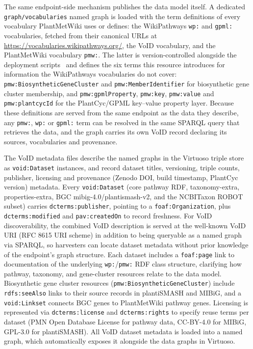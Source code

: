\documentclass[11pt,a4paper]{article}
\begin{document}
The same endpoint-side mechanism publishes the data model itself. A dedicated
\texttt{graph/\allowbreak{}vocabularies} named graph is loaded with the term definitions of every vocabulary
PlantMetWiki uses or defines: the WikiPathways \texttt{wp:} and \texttt{gpml:} vocabularies, fetched
from their canonical URLs at \url{https://vocabularies.wikipathways.org/}, the VoID vocabulary, and
the PlantMetWiki vocabulary \texttt{pmw:}. The latter is version-controlled alongside the deployment
scripts~\cite{delpup2026snorql} and defines the six terms this resource introduces for information the
WikiPathways vocabularies do not cover: \texttt{pmw:BiosyntheticGeneCluster} and
\texttt{pmw:MemberIdentifier} for biosynthetic gene cluster membership, and
\texttt{pmw:gpmlProperty}, \texttt{pmw:key}, \texttt{pmw:value} and \texttt{pmw:plantcycId} for the
PlantCyc/GPML key--value property layer. Because these definitions are served from the same endpoint
as the data they describe, any \texttt{pmw:}, \texttt{wp:} or \texttt{gpml:} term can be resolved in
the same SPARQL query that retrieves the data, and the graph carries its own VoID record declaring
its sources, vocabularies and provenance.

The VoID metadata files describe the named graphs in the Virtuoso triple store as
\texttt{void:Dataset} instances, and record dataset titles, versioning, triple counts, publisher,
licensing and provenance (Zenodo DOI, build timestamp, PlantCyc version) metadata. Every
\texttt{void:Dataset} (core pathway RDF, taxonomy-extra, properties-extra, BGC
mibig-4.0/plantismash-v2, and the NCBITaxon ROBOT subset) carries \texttt{dcterms:\allowbreak{}publisher}, pointing
to a \texttt{foaf:\allowbreak{}Organization}, plus \texttt{dcterms:\allowbreak{}modified} and \texttt{pav:\allowbreak{}createdOn} to record
freshness. For VoID discoverability, the combined VoID description is served at the well-known VoID
URI (RFC 8615 URI scheme) in addition to being queryable as a named graph via SPARQL, so harvesters
can locate dataset metadata without prior knowledge of the endpoint's graph structure. Each dataset
includes a \texttt{foaf:page} link to documentation of the underlying \texttt{wp:}/\texttt{pmw:} RDF
class structure, clarifying how pathway, taxonomy, and gene-cluster resources relate to the data
model. Biosynthetic gene cluster resources (\texttt{pmw:BiosyntheticGeneCluster}) include
\texttt{rdfs:seeAlso} links to their source records in plantiSMASH and MIBiG, and a
\texttt{void:Linkset} connects BGC genes to PlantMetWiki pathway genes. Licensing is represented via
\texttt{dcterms:license} and \texttt{dcterms:rights} to specify reuse terms per dataset (PMN Open
Database License for pathway data, CC-BY-4.0 for MIBiG, GPL-3.0 for plantiSMASH). All VoID dataset
metadata is loaded into a named graph, which automatically exposes it alongside the data graphs in
Virtuoso.
\end{document}
